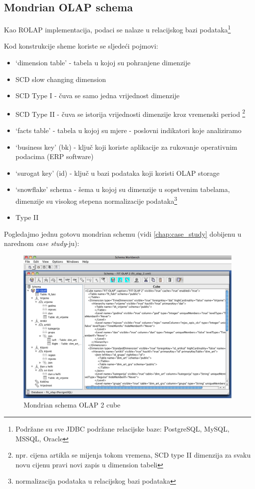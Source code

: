 \documentclass[times, utf8, seminar]{fit}
\begin{document}
\subsection{Mondrian OLAP schema} 

Kao ROLAP implementacija, podaci se nalaze u relacijskog bazi podataka\footnote{Podržane su sve JDBC podržane relacijske baze: PostgreSQL, MySQL, MSSQL, Oracle}

Kod konstrukcije sheme koriste se sljedeći pojmovi:

\begin{itemize}
  \item `dimension table' - tabela u kojoj su pohranjene dimenzije
  \item SCD slow changing dimension
  \item SCD Type I - čuva se samo jedna vrijednost dimenzije
  \item SCD Type II - čuva se istorija vrijednosti dimenzije kroz vremenski period \footnote{npr. cijena artikla se mijenja tokom vremena, SCD type II dimenzija za svaku novu cijenu pravi novi zapis u dimension tabeli}
  \item `facts table' - tabela u kojoj su mjere - poslovni indikatori koje analiziramo
  \item `business key' (bk) - ključ koji koriste aplikacije za rukovanje operativnim podacima (ERP software)
  \item `surogat key' (id) - ključ u bazi podataka koji koristi OLAP storage
  \item `snowflake' schema - šema u kojoj su dimenzije u sopstvenim tabelama, dimenzije su visokog stepena normalizacije podataka\footnote{normalizacija podataka u relacijskog bazi podataka} \cite{web:pentaho:mondrian_schema}
  \item Type II
\end{itemize}

Pogledajmo jednu gotovu mondrian schemu (vidi \ref{chap:case_study} dobijenu u narednom \emph{case study}-ju):

\begin{figure}[h]
\centering
\includegraphics[width=15cm]{img/fit_olap_mondrian_schema}
\caption{Mondrian schema OLAP 2 cube}
\end{figure}
\end{document}
